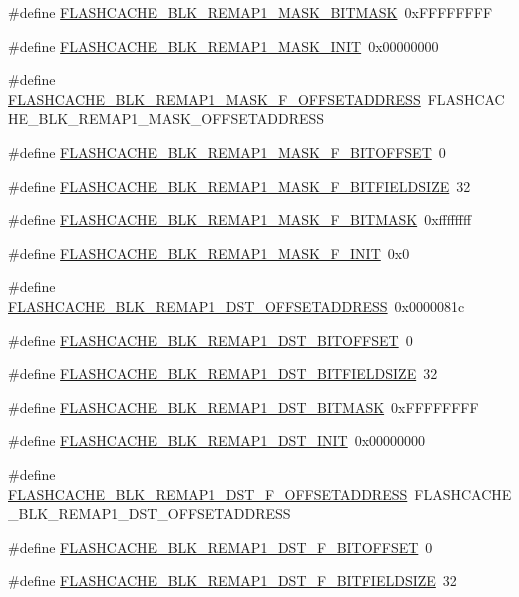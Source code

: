 \begin{DoxyCompactItemize}
\#define \hyperlink{a00550_a13bee40cbd1aff071896ab1c27b0058e}{FLASHCACHE\_\-BLK\_\-REMAP1\_\-MASK\_\-BITMASK}~0xFFFFFFFF
\item 
\#define \hyperlink{a00550_a78cc46a5744814dd1cc90cb8c5237ed9}{FLASHCACHE\_\-BLK\_\-REMAP1\_\-MASK\_\-INIT}~0x00000000
\item 
\#define \hyperlink{a00550_a1a160d9336b8fe0e20022d4fe3ee4cbf}{FLASHCACHE\_\-BLK\_\-REMAP1\_\-MASK\_\-F\_\-OFFSETADDRESS}~FLASHCACHE\_\-BLK\_\-REMAP1\_\-MASK\_\-OFFSETADDRESS
\item 
\#define \hyperlink{a00550_a4802ca5883efcf8a339c9784e564fa31}{FLASHCACHE\_\-BLK\_\-REMAP1\_\-MASK\_\-F\_\-BITOFFSET}~0
\item 
\#define \hyperlink{a00550_ab1642bceeaf4236ad915d303bb4fcef0}{FLASHCACHE\_\-BLK\_\-REMAP1\_\-MASK\_\-F\_\-BITFIELDSIZE}~32
\item 
\#define \hyperlink{a00550_a96b360a15b23b8fae7e6d390e404d254}{FLASHCACHE\_\-BLK\_\-REMAP1\_\-MASK\_\-F\_\-BITMASK}~0xffffffff
\item 
\#define \hyperlink{a00550_a8192cf9dd514b395ae6adcbd3a047e78}{FLASHCACHE\_\-BLK\_\-REMAP1\_\-MASK\_\-F\_\-INIT}~0x0
\item 
\#define \hyperlink{a00550_a9197bc4e2bd13369afc1da05a9f6c3a7}{FLASHCACHE\_\-BLK\_\-REMAP1\_\-DST\_\-OFFSETADDRESS}~0x0000081c
\item 
\#define \hyperlink{a00550_ada9bed7f145ec6d359e18cb640784e41}{FLASHCACHE\_\-BLK\_\-REMAP1\_\-DST\_\-BITOFFSET}~0
\item 
\#define \hyperlink{a00550_a2ce952a218c6c164f0b7864a4d919fa8}{FLASHCACHE\_\-BLK\_\-REMAP1\_\-DST\_\-BITFIELDSIZE}~32
\item 
\#define \hyperlink{a00550_ae0a70bae71111616b642ddb0c1cb93a8}{FLASHCACHE\_\-BLK\_\-REMAP1\_\-DST\_\-BITMASK}~0xFFFFFFFF
\item 
\#define \hyperlink{a00550_ab0bf2e992d6176b4636e768534987905}{FLASHCACHE\_\-BLK\_\-REMAP1\_\-DST\_\-INIT}~0x00000000
\item 
\#define \hyperlink{a00550_a9d3e8b8b4730ea4478c7414bcac747c9}{FLASHCACHE\_\-BLK\_\-REMAP1\_\-DST\_\-F\_\-OFFSETADDRESS}~FLASHCACHE\_\-BLK\_\-REMAP1\_\-DST\_\-OFFSETADDRESS
\item 
\#define \hyperlink{a00550_ae36ec02381463a702532ccebfe873256}{FLASHCACHE\_\-BLK\_\-REMAP1\_\-DST\_\-F\_\-BITOFFSET}~0
\item 
\#define \hyperlink{a00550_a7c78d64779781637595d2630a74b018b}{FLASHCACHE\_\-BLK\_\-REMAP1\_\-DST\_\-F\_\-BITFIELDSIZE}~32
\item 

\end{DoxyCompactItemize}
